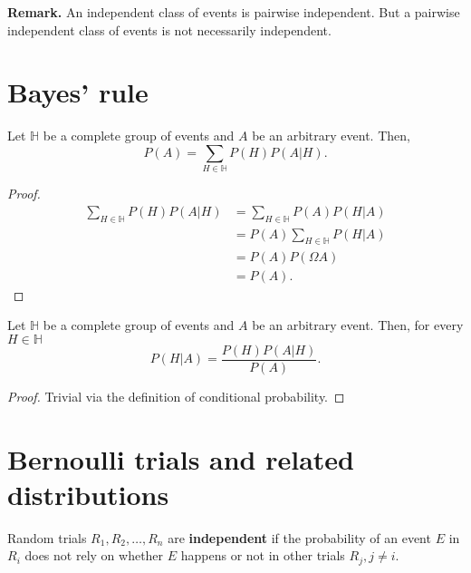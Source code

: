 \textbf{Remark.} An independent class of events is pairwise independent. But a
pairwise independent class of events is not necessarily independent.


\section{Bayes' rule} %
\label{sec:Bayes' rule}

\begin{theorem}
\label{thr:Complete probability formula}
  
Let \( \mathbb{H}  \) be a complete group of events and \( A \) be an arbitrary
event. Then,
\[
  P(A) = \sum_{H \in \mathbb{H}} P(H)P(A|H)
.\] 
\end{theorem}

\begin{proof}
  \begin{align*}
    \sum_{H \in \mathbb{H}} P(H)P(A|H) &= \sum_{H \in \mathbb{H}} P(A)P(H | A)\\
                                       &= P(A) \sum_{H \in \mathbb{H}} P(H|A)\\
                                       &= P(A) P(\Omega A)\\
                                       &= P(A)
  .\end{align*}
\end{proof}

\begin{theorem}
\label{thr:Bayes' Rule}
  Let \( \mathbb{H} \) be a complete group of events and \( A \) be an arbitrary
  event. Then, for every \( H \in \mathbb{H} \)
  \[ P(H | A) = \frac{P(H)P(A | H)}{P(A)}.\]
\end{theorem}

\begin{proof}
  Trivial via the definition of conditional probability.
\end{proof}


\section{Bernoulli trials and related distributions} %
\label{sec:Bernoulli trials and related distributions}

\begin{definition}
\label{def:Independent trials}
  Random trials \( R_{1}, R_{2}, \ldots, R_{n}  \) are \textbf{independent} if the
  probability of an event \( E \) in \( R_{i} \) does not rely on whether \(
  E\) happens or not in other trials \( R_{j}, j \neq i \).
\end{definition}

